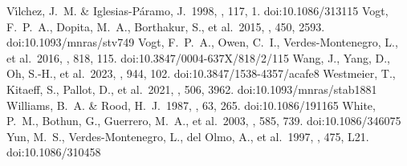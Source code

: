 \documentclass{aa}
\begin{document}
\begin{thebibliography}{}
      V{\'\i}lchez, J.~M. \& Iglesias-P{\'a}ramo, J.\ 1998, \apjs, 117, 1. doi:10.1086/313115
      Vogt, F.~P.~A., Dopita, M.~A., Borthakur, S., et al.\ 2015, \mnras, 450, 2593. doi:10.1093/mnras/stv749
      Vogt, F.~P.~A., Owen, C.~I., Verdes-Montenegro, L., et al.\ 2016, \apj, 818, 115. doi:10.3847/0004-637X/818/2/115
      Wang, J., Yang, D., Oh, S.-H., et al.\ 2023, \apj, 944, 102. doi:10.3847/1538-4357/acafe8
      Westmeier, T., Kitaeff, S., Pallot, D., et al.\ 2021, \mnras, 506, 3962. doi:10.1093/mnras/stab1881
      Williams, B.~A. \& Rood, H.~J.\ 1987, \apjs, 63, 265. doi:10.1086/191165
      White, P.~M., Bothun, G., Guerrero, M.~A., et al.\ 2003, \apj, 585, 739. doi:10.1086/346075
      Yun, M.~S., Verdes-Montenegro, L., del Olmo, A., et al.\ 1997, \apjl, 475, L21. doi:10.1086/310458
\end{thebibliography}
\end{document}
